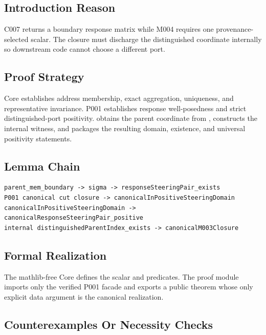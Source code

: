 \subsection{Introduction Reason}\label{introduction-reason-23}

C007 returns a boundary response matrix while M004 requires one
provenance-selected scalar. The closure must discharge the distinguished
coordinate internally so downstream code cannot choose a different port.

\subsection{Proof Strategy}\label{proof-strategy-8}

Core establishes address membership, exact aggregation, uniqueness, and
representative invariance. P001 establishes response well-posedness and
strict distinguished-port positivity. \texttt{\protect{}}
obtains the parent coordinate from
\texttt{\protect{}}, constructs the internal
witness, and packages the resulting domain, existence, and universal
positivity statements.

\subsection{Lemma Chain}\label{lemma-chain-8}

\begin{verbatim}
parent_mem_boundary -> sigma -> responseSteeringPair_exists
P001 canonical cut closure -> canonicalInPositiveSteeringDomain
canonicalInPositiveSteeringDomain -> canonicalResponseSteeringPair_positive
internal distinguishedParentIndex_exists -> canonicalM003Closure
\end{verbatim}

\subsection{Formal Realization}\label{formal-realization-8}

The mathlib-free Core defines the scalar and predicates. The proof
module \texttt{\protect{}} imports only the verified
P001 facade and exports a public theorem whose only explicit data
argument is the canonical realization.

\subsection{Counterexamples Or Necessity
Checks}\label{counterexamples-or-necessity-checks-8}


